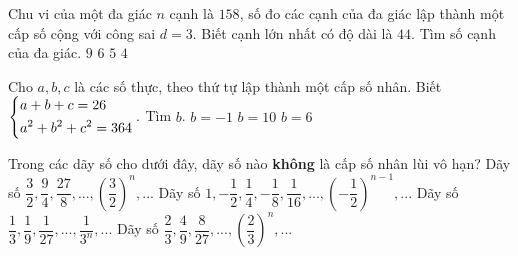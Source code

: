 \begin{ex}%
	Chu vi của một đa giác $n$ cạnh là $158$, số đo các cạnh của đa giác lập thành một cấp số cộng với công sai $d=3$. Biết cạnh lớn nhất có độ dài là $44$. Tìm số cạnh của đa giác.
	\choice
	{$9$}
	{$6$}
	{$5$}
	{\True $4$}
\end{ex}
\begin{ex}%
Cho $a,b,c$ là các số thực, theo thứ tự lập thành một cấp số nhân. Biết $\left\{\begin{aligned}&a+b+c=26\\& a^2+b^2+c^2=364\end{aligned}\right..$ Tìm $b$.
	{$b=-1$}
	{$b=10$}
	{\True $b=6$}
\end{ex}
\begin{ex}%
Trong các dãy số cho dưới đây, dãy số nào \textbf{không} là cấp số nhân lùi vô hạn?
\choice
{\True Dãy số $\dfrac{3}{2},\dfrac{9}{4},\dfrac{27}{8},...,\left(\dfrac{3}{2}\right)^n,...$}
{Dãy số $1,-\dfrac{1}{2},\dfrac{1}{4},-\dfrac{1}{8},\dfrac{1}{16},...,\left(-\dfrac{1}{2}\right)^{n-1},...$} 
{Dãy số $\dfrac{1}{3},\dfrac{1}{9},\dfrac{1}{27},...,\dfrac{1}{3^n},...$}
{Dãy số $\dfrac{2}{3},\dfrac{4}{9},\dfrac{8}{27},...,\left(\dfrac{2}{3}\right)^n,...$}
\end{ex}

